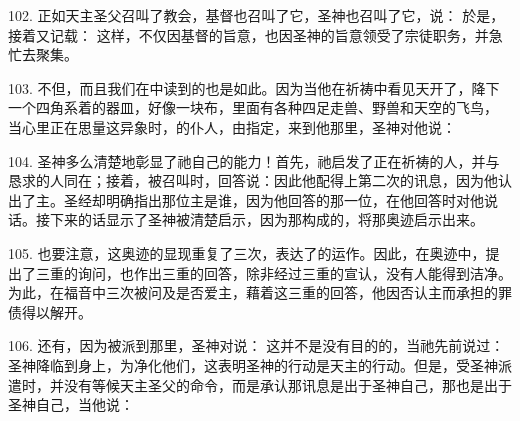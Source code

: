 102. 正如天主圣父召叫了教会，基督也召叫了它，圣神也召叫了它，说： 於是，接着又记载： 这样，不仅因基督的旨意，也因圣神的旨意领受了宗徒职务，并急忙去聚集。\par

103. 不但，而且我们在中读到的也是如此。因为当他在祈祷中看见天开了，降下一个四角系着的器皿，好像一块布，里面有各种四足走兽、野兽和天空的飞鸟， 当心里正在思量这异象时，的仆人，由指定，来到他那里，圣神对他说： \par

104. 圣神多么清楚地彰显了祂自己的能力！首先，祂启发了正在祈祷的人，并与恳求的人同在；接着，被召叫时，回答说：因此他配得上第二次的讯息，因为他认出了主。圣经却明确指出那位主是谁，因为他回答的那一位，在他回答时对他说话。接下来的话显示了圣神被清楚启示，因为那构成的，将那奥迹启示出来。\par

105. 也要注意，这奥迹的显现重复了三次，表达了的运作。因此，在奥迹中，提出了三重的询问，也作出三重的回答，除非经过三重的宣认，没有人能得到洁净。为此，在福音中三次被问及是否爱主，藉着这三重的回答，他因否认主而承担的罪债得以解开。\par

106. 还有，因为被派到那里，圣神对说： 这并不是没有目的的，当祂先前说过：  圣神降临到身上，为净化他们，这表明圣神的行动是天主的行动。但是，受圣神派遣时，并没有等候天主圣父的命令，而是承认那讯息是出于圣神自己，那也是出于圣神自己，当他说：\par

